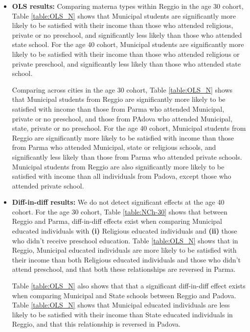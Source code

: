\documentclass[11pt]{article}
\begin{document}
\begin{itemize}
	\begin{itemize}
	\item \textbf{OLS results:} Comparing materna types within Reggio in the age 30 cohort, Table \ref{table:OLS_N} shows that Municipal students are significantly more likely to be satisfied with their income than those who attended religious, private or no preschool, and significantly less likely than those who attended state school. For the age 40 cohort, Municipal students are significantly more likely to be satisfied with their income than those who attended religious or private preschool, and significantly less likely than those who attended state school.

	Comparing across cities in the age 30 cohort, Table \ref{table:OLS_N} shows that Municipal students from Reggio are significantly more likely to be satisfied with income than those from Parma who attended Municipal, private or no preschool, and those from PAdova who attended Municipal, state, private or no preschool. For the age 40 cohort, Municipal students from Reggio are significantly more likely to be satisfied with income than those from Parma who attended Municipal, state or religious schools, and significantly less likely than those from Parma who attended private schools. Municipal students from Reggio are also significantly more likely to be satisfied with income than all individuals from Padova, except those who attended private school.
	
	\item \textbf{Diff-in-diff results:} We do not detect significant effects at the age 40 cohort. For the age 30 cohort, Table \ref{table:NCh-30} shows that between Reggio and Parma, diff-in-diff effects exist when comparing Municipal educated individuals with \textbf{(i)} Religious educated individuals and  \textbf{(ii)} those who didn't receive preschool education. Table \ref{table:OLS_N} shows that in Reggio, Municipal educated individuals are more likely to be satisfied with their income than both Religious educated individuals and those who didn't attend preschool, and that both these relationships are reversed in Parma. 
	
	Table \ref{table:OLS_N} also shows that that a significant diff-in-diff effect exists when comparing Municipal and State schools between Reggio and Padova. Table \ref{table:OLS_N} shows that Municipal educated individuals are less likely to be satisfied with their income than State educated individuals in Reggio, and that this relationship is reversed in Padova.
	\end{itemize}



\end{itemize}
\end{document}
